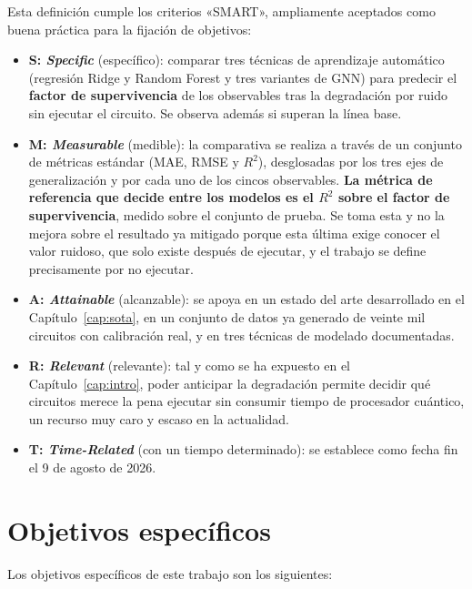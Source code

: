 Esta definición cumple los criterios «SMART», ampliamente aceptados como buena práctica para la fijación de objetivos:

\begin{itemize}
    \item \textbf{S: \textit{Specific}} (específico): comparar tres técnicas de aprendizaje automático (regresión Ridge y Random Forest y tres variantes de GNN) para predecir el \textbf{factor de supervivencia} de los observables tras la degradación por ruido sin ejecutar el circuito. Se observa además si superan la línea base.
    \item \textbf{M: \textit{Measurable}} (medible): la comparativa se realiza a través de un
          conjunto de métricas estándar (MAE, RMSE y $R^2$), desglosadas por los tres ejes de
          generalización y por cada uno de los cincos observables. \textbf{La métrica de referencia que decide entre
          los modelos es el $R^2$ sobre el factor de supervivencia}, medido sobre el conjunto
          de prueba. Se toma esta y no la mejora sobre el resultado ya mitigado porque esta
          última exige conocer el valor ruidoso, que solo existe después de ejecutar, y el
          trabajo se define precisamente por no ejecutar.
    \item \textbf{A: \textit{Attainable}} (alcanzable): se apoya en un estado del arte
          desarrollado en el Capítulo~\ref{cap:sota}, en un conjunto de datos ya generado de
          veinte mil circuitos con calibración real, y en tres técnicas de modelado documentadas.
    \item \textbf{R: \textit{Relevant}} (relevante): tal y como se ha expuesto en el
          Capítulo~\ref{cap:intro}, poder anticipar la degradación permite decidir qué
          circuitos merece la pena ejecutar sin consumir tiempo de procesador cuántico, un recurso muy caro y escaso en la actualidad.
    \item \textbf{T: \textit{Time-Related}} (con un tiempo determinado): se establece como
          fecha fin el 9 de agosto de 2026.
\end{itemize}

\section{Objetivos específicos}
\label{sec:objetivos_especificos}

Los objetivos específicos de este trabajo son los siguientes:

